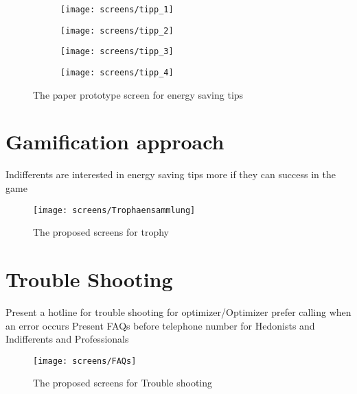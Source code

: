 \begin{figure}[h]
	\centering
	\begin{subfigure}[b]{0.24\columnwidth}
		\centering
		\texttt{[image: screens/tipp\_1]}
		\label{fig:tipps:professional}
	\end{subfigure}
	\begin{subfigure}[b]{0.24\columnwidth}
		\centering
		\texttt{[image: screens/tipp\_2]}
		\label{fig:tipps:optimizer}
	\end{subfigure}
	\begin{subfigure}[b]{0.24\columnwidth}
		\centering
		\texttt{[image: screens/tipp\_3]}
		\label{fig:tipps:indifferent}
	\end{subfigure}
	\begin{subfigure}[b]{0.24\columnwidth}
		\centering
		\texttt{[image: screens/tipp\_4]}
		\label{fig:tipps:hedonist}
	\end{subfigure}
	\caption{The paper prototype screen for energy saving tips}
	\label{fig:tipps} %
\end{figure}

\section{Gamification approach}
 Indifferents are interested in energy saving tips more if they can success in the game
\begin{figure}[h]
	\centering
	\texttt{[image: screens/Trophaensammlung]}
	\caption{The proposed screens for trophy}
	\label{fig:trophaen} %
\end{figure}

\section{Trouble Shooting}
Present a hotline for trouble shooting for optimizer/Optimizer prefer calling when an error occurs
Present FAQs before telephone number for Hedonists and Indifferents and Professionals

\begin{figure}[h]
	\centering
	\texttt{[image: screens/FAQs]}
	\caption{The proposed screens for Trouble shooting}
	\label{fig:trouble} %
\end{figure}





